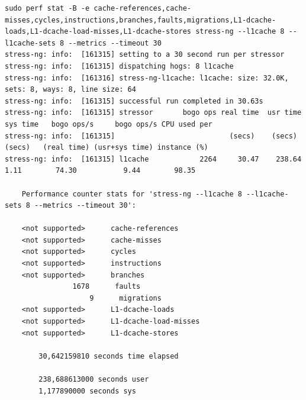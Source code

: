 \begin{verbatim}
sudo perf stat -B -e cache-references,cache-misses,cycles,instructions,branches,faults,migrations,L1-dcache-loads,L1-dcache-load-misses,L1-dcache-stores stress-ng --l1cache 8 --l1cache-sets 8 --metrics --timeout 30
stress-ng: info:  [161315] setting to a 30 second run per stressor
stress-ng: info:  [161315] dispatching hogs: 8 l1cache
stress-ng: info:  [161316] stress-ng-l1cache: l1cache: size: 32.0K, sets: 8, ways: 8, line size: 64
stress-ng: info:  [161315] successful run completed in 30.63s
stress-ng: info:  [161315] stressor       bogo ops real time  usr time  sys time   bogo ops/s     bogo ops/s CPU used per
stress-ng: info:  [161315]                           (secs)    (secs)    (secs)   (real time) (usr+sys time) instance (%)
stress-ng: info:  [161315] l1cache            2264     30.47    238.64      1.11        74.30           9.44        98.35

    Performance counter stats for 'stress-ng --l1cache 8 --l1cache-sets 8 --metrics --timeout 30':

    <not supported>      cache-references                                                      
    <not supported>      cache-misses                                                          
    <not supported>      cycles                                                                
    <not supported>      instructions                                                          
    <not supported>      branches                                                              
                1678      faults                                                                
                    9      migrations                                                            
    <not supported>      L1-dcache-loads                                                       
    <not supported>      L1-dcache-load-misses                                                 
    <not supported>      L1-dcache-stores                                                      

        30,642159810 seconds time elapsed

        238,688613000 seconds user
        1,177890000 seconds sys
\end{verbatim}

